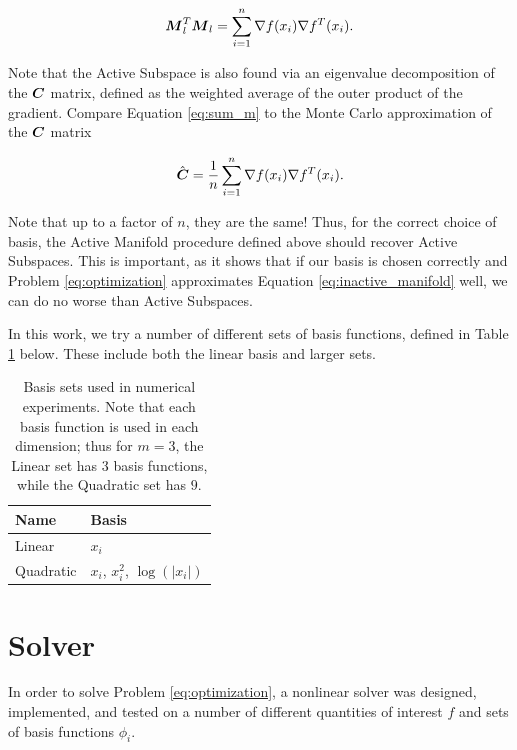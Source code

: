 \documentclass[]{aiaa-tc}%
\begin{document}
\begin{equation}
\label{eq:sum_m}
\boldsymbol{M}_l^T\boldsymbol{M}_l = \sum_{i=1}^n \nabla f(x_i) \nabla f^T(x_i).
\end{equation}

Note that the Active Subspace is also found via an eigenvalue decomposition of the $\boldsymbol{C}$ matrix, defined as the weighted average of the outer product of the gradient.\cite{constantine2015} Compare Equation \ref{eq:sum_m} to the Monte Carlo approximation of the $\boldsymbol{C}$ matrix

\begin{equation}
\label{eq:sum_c}
\hat{\boldsymbol{C}} = \frac{1}{n} \sum_{i=1}^n \nabla f(x_i) \nabla f^T(x_i).
\end{equation}

Note that up to a factor of $n$, they are the same! Thus, for the correct choice of basis, the Active Manifold procedure defined above should recover Active Subspaces. This is important, as it shows that if our basis is chosen correctly and Problem \ref{eq:optimization} approximates Equation \ref{eq:inactive_manifold} well, we can do no worse than Active Subspaces.

In this work, we try a number of different sets of basis functions, defined in Table \ref{tab:basis} below. These include both the linear basis and larger sets.

\begin{table}
\centering
\begin{tabular}{ll}
\toprule
Name & Basis \\
\midrule
Linear & $x_i$ \\
Quadratic & $x_i$, $x_i^2$, $\log(|x_i|)$ \\
\bottomrule
\end{tabular}
\caption{Basis sets used in numerical experiments. Note that each basis function is used in each dimension; thus for $m=3$, the Linear set has $3$ basis functions, while the Quadratic set has $9$.}
\label{tab:basis}
\end{table}

\section{Solver} \label{sec:solver}
In order to solve Problem \ref{eq:optimization}, a nonlinear solver was designed, implemented, and tested on a number of different quantities of interest $f$ and sets of basis functions $\phi_i$.
\end{document}
